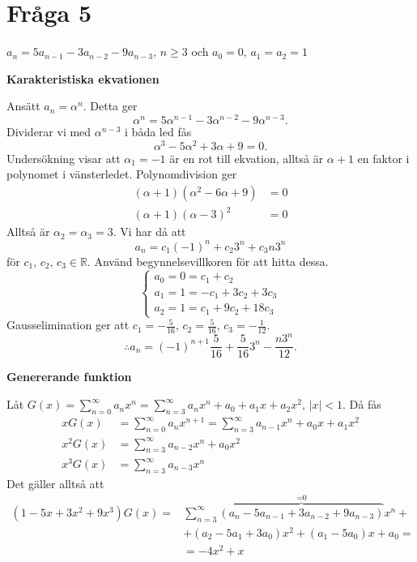 \documentclass{article}
\begin{document}
\section{Fråga 5}
$a_n = 5a_{n-1}-3a_{n-2}-9a_{n-3}, \, n \geq 3$ och $a_0 = 0, \, a_1 = a_2 = 1$ 

\textbf{Karakteristiska ekvationen}

Ansätt $a_n = \alpha^n$. Detta ger
\[
	\alpha^n = 5\alpha^{n-1}-3\alpha^{n-2}-9\alpha^{n-3}
.\] 
Dividerar vi med $\alpha^{n-3}$ i båda led fås
 \[
\alpha^3-5\alpha^2+3\alpha+9 = 0
.\]
Undersökning visar att $\alpha_1=-1$ är en rot till ekvation, alltså är $\alpha + 1$ en faktor i polynomet i vänsterledet. Polynomdivision ger
\begin{equation}
\begin{aligned}
	(\alpha+1)\left( \alpha^2-6\alpha+9 \right) &= 0\\
	(\alpha+1)(\alpha-3)^2 &= 0
\end{aligned} 
\end{equation}
Alltså är $\alpha_2 = \alpha_3 = 3$. Vi har då att
 \[
a_n = c_1(-1)^{n}+c_2 3^{n} + c_3 n 3^{n}
\] 
för $c_1, \, c_2, \, c_3 \in \mathbb{R}$.
Använd begynnelsevillkoren för att hitta dessa.
\begin{equation}
\begin{cases}
	a_0=0=c_1+c_2\\
	a_1=1=-c_1+3c_2+3c_3\\
	a_2=1=c_1+9c_2+18c_3
\end{cases}	
\end{equation}
Gausselimination ger att $c_1=-\frac{5}{16}, \, c_2 = \frac{5}{16}, \, c_3 = -\frac{1}{12}$.
\[
\therefore a_n = (-1)^{n+1}\frac{5}{16} + \frac{5}{16}3^{n}-\frac{n 3^{n}}{12}
.\] 

\textbf{Genererande funktion}

Låt $G(x) = \sum\limits_{n=0}^\infty a_n x^{n} = \sum\limits_{n=3}^\infty a_n x^{n} + a_0 + a_1 x + a_2 x^2, \, \lvert x \rvert < 1$. Då fås
\begin{equation}
\begin{aligned}
	xG(x) &= \sum\limits_{n=0}^\infty a_n x^{n+1} = \sum\limits_{n=3}^\infty a_{n-1} x^n + a_0 x + a_1 x^2\\
	x^2G(x) &= \sum\limits_{n=3}^\infty a_{n-2} x^n + a_0 x^2\\
	x^3G(x) &= \sum\limits_{n=3}^\infty a_{n-3} x^n
\end{aligned}	
\end{equation}
Det gäller alltså att
\begin{equation}
	\begin{aligned}
		(1 - 5x + 3 x^2 + 9x^3)G(x) = &\sum\limits_{n=3}^\infty \overbrace{(a_n - 5a_{n-1} + 3a_{n-2} + 9a_{n-3})}^\text{=0} x^{n} + \\ &+ (a_2-5a_1+3a_0)x^2+(a_1-5a_0)x+a_0 =\\&= -4x^2+x
	\end{aligned}
\end{equation}
\end{document}
